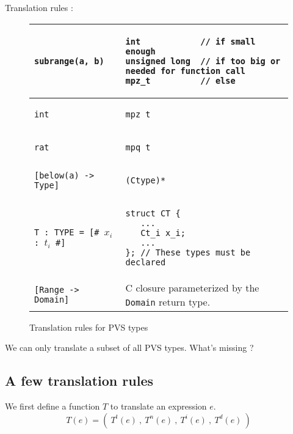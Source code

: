 \documentclass[12pt,a4paper]{article}
\newcommand{\cl}[1]{\texttt{#1}}
\begin{document}
Translation rules :

\begin{figure}[!ht]
\begin{tabular}{|l|l|}
\hline
\cl{subrange(a, b)} &
\begin{lstlisting}
int            // if small enough
unsigned long  // if too big or needed for function call
mpz_t          // else
\end{lstlisting} \\ \hline
\cl{int} &
\begin{lstlisting}
mpz_t
\end{lstlisting} \\ \hline
\cl{rat} &
\begin{lstlisting}
mpq_t
\end{lstlisting} \\ \hline
\cl{[below(a) -> Type]} &
\begin{lstlisting}
(Ctype)*
\end{lstlisting} \\ \hline
\cl{T : TYPE = [\# $x_i$ : $t_i$ \#]}  &
\begin{lstlisting}
struct CT {
   ...
   Ct_i x_i;
   ...
}; // These types must be declared
\end{lstlisting} \\ \hline
\cl{[Range -> Domain]} & C closure parameterized by the \cl{Domain} return type.\\ \hline
\end{tabular}
\caption{Translation rules for PVS types}
\end{figure}



We can only translate a subset of all PVS types.
What's missing ?






\subsection{A few translation rules}

We first define a function $T$ to translate an expression $e$.
$$ T(e) = ( \ T^t(e) \ , \ T^n(e) \ , \ T^i(e) \ , \ T^d(e) \ ) $$
\end{document}
